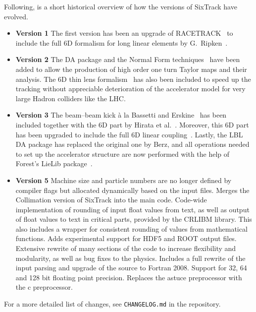 Following, is a short historical overview of how the versions of SixTrack have evolved.
\begin{itemize}
    \item \textbf{Version 1}
        The first version has been an upgrade of RACETRACK~\cite{RACETRACK} to include the full 6D formalism for long linear elements by G.~Ripken~\cite{Ripken85}.
    \item \textbf{Version 2}
        The DA package and the Normal Form techniques~\cite{Berz89,Forest89} have been added to allow the production of high order one turn Taylor maps and their analysis.
        The 6D thin lens formalism~\cite{Ripken95} has also been included to speed up the tracking without appreciable deterioration of the accelerator model for very large Hadron colliders like the LHC.
    \item \textbf{Version 3}
        The beam--beam kick \`a la Bassetti and Erskine~\cite{BasErs} has been included together with the 6D part by Hirata et al.~\cite{Hirata}.
        Moreover, this 6D part has been upgraded to include the full 6D linear coupling~\cite{ripbeam}.
        Lastly, the LBL DA package has replaced the original one by Berz, and all operations needed to set up the accelerator structure are now performed with the help of Forest's LieLib package~\cite{DALIE}.
    \item \textbf{Version 5}
        Machine size and particle numbers are no longer defined by compiler flags but allocated dynamically based on the input files.
        Merges the Collimation version of SixTrack into the main code.
        Code-wide implementation of rounding of input float values from text, as well as output of float values to text in critical parts, provided by the CRLIBM library.
        This also includes a wrapper for consistent rounding of values from mathematical functions.
        Adds experimental support for HDF5 and ROOT output files.
        Extensive rewrite of many sections of the code to increase flexibility and modularity, as well as bug fixes to the physics.
        Includes a full rewrite of the input parsing and upgrade of the source to Fortran 2008.
        Support for 32, 64 and 128 bit floating point precision.
        Replaces the astuce preprocessor with the c preprocessor.
\end{itemize}

For a more detailed list of changes, see \texttt{CHANGELOG.md} in the repository.


